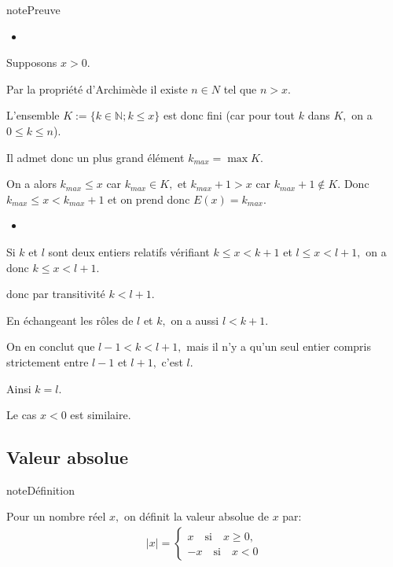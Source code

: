 \documentclass[letterpaper,10pt,french]{jupyterBook}
\begin{document}
\begin{sphinxadmonition}{note}{Preuve}
\begin{itemize}
\item {} 
\sphinxAtStartPar
{}

\end{itemize}

\sphinxAtStartPar
Supposons \(x>0\).

\sphinxAtStartPar
Par la propriété d’Archimède il existe \(n\in N\) tel que \(n>x.\)

\sphinxAtStartPar
L’ensemble \(K:=\{k\in \mathbb{N}; k\leq x\}\) est donc fini (car pour tout \(k\) dans \(K,\) on a \(0\leq k \leq n\)).

\sphinxAtStartPar
Il admet donc un plus grand élément
\(k_{max} =\max K.\)

\sphinxAtStartPar
On a alors \(k_{max}\leq x\) car \(k_{max} \in K,\) et \(k_{max} + 1 > x\) car \(k_{max} + 1 \notin K.\) Donc \(k_{max}\leq x < k_{max} + 1\) et on prend donc \(E(x)= k_{max}.\)
\begin{itemize}
\item {} 
\sphinxAtStartPar
{}

\end{itemize}

\sphinxAtStartPar
Si \(k\) et \(l\) sont deux entiers relatifs vérifiant \(k \leq x < k + 1\) et \(l \leq x < l + 1,\) on a donc \(k \leq x < l + 1\).

\sphinxAtStartPar
donc par transitivité \(k < l + 1.\)

\sphinxAtStartPar
En échangeant les rôles de \(l\) et \(k,\) on a aussi \(l< k + 1.\)

\sphinxAtStartPar
On en conclut que \(l-1 < k < l + 1,\) mais
il n’y a qu’un seul entier compris strictement entre \(l-1\) et \(l+1,\) c’est \(l.\)

\sphinxAtStartPar
Ainsi \(k = l.\)

\sphinxAtStartPar
Le cas \(x < 0\) est similaire.
\end{sphinxadmonition}


\subsection{Valeur absolue}
\label{\detokenize{proprties:valeur-absolue}}
\begin{sphinxadmonition}{note}{Définition}

\sphinxAtStartPar
Pour un nombre réel \(x,\) on définit la valeur absolue de \(x\) par:
\begin{equation*}
\begin{split}
|x|=\left\{
\begin{array}{ll}
x\quad\mbox{si}\quad x\geq0,\\
-x \quad\mbox{si}\quad x<0
\end{array}
\right.
\end{split}
\end{equation*}\end{sphinxadmonition}
\end{document}

